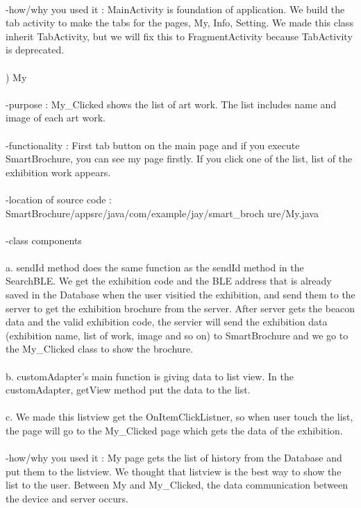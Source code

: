 \documentclass[conference]{IEEEtran}
\begin{document}
\\ -how/why you used it : MainActivity is foundation of application. We build the tab activity to make the tabs for the pages, My, Info, Setting. We made this class inherit TabActivity, but we will fix this to FragmentActivity because TabActivity is deprecated.\\\\
) My\\\\
-purpose : My\_Clicked shows the list of art work. The list includes name and image of each art work.\\
\\ -functionality : First tab button on the main page and if you execute SmartBrochure, you can see my page firstly. If you click one of the list, list of the exhibition work appears.\\
\\ -location of source code : SmartBrochure/appsrc/java/com/example/jay/smart\_broch
ure/My.java\\
\\ -class components\\
\\ a. sendId method does the same function as the sendId method in the SearchBLE. We get the exhibition code and the BLE address that is already saved in the Database when the user visitied the exhibition, and send them to the server to get the exhibition brochure from the server. After server gets the beacon data and the valid exhibition code, the servier will send the exhibition data (exhibition name, list of work, image and so on) to SmartBrochure and we go to the My\_Clicked class to show the brochure.\\
\\ b. customAdapter's main function is giving data to list view. In the customAdapter, getView method put the data to the list.\\
\\ c. We made this listview get the OnItemClickListner, so when user touch the list, the page will go to the My\_Clicked page which gets the data of the exhibition.\\
\\ -how/why you used it : My page gets the list of history from the Database and put them to the listview. We thought that listview is the best way to show the list to the user. Between My and My\_Clicked, the data communication between the device and server occurs.\\\\
\end{document}
